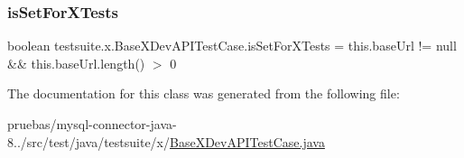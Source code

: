 \subsubsection{\texorpdfstring{is\+Set\+For\+X\+Tests}{isSetForXTests}}
{\footnotesize\ttfamily boolean testsuite.\+x.\+Base\+X\+Dev\+A\+P\+I\+Test\+Case.\+is\+Set\+For\+X\+Tests = this.\+base\+Url != null \&\& this.\+base\+Url.\+length() $>$ 0\hspace{0.3cm}{\ttfamily [protected]}}



The documentation for this class was generated from the following file\+:\begin{DoxyCompactItemize}
\item 
pruebas/mysql-\/connector-\/java-\/8../src/test/java/testsuite/x/\mbox{\hyperlink{_base_x_dev_a_p_i_test_case_8java}{Base\+X\+Dev\+A\+P\+I\+Test\+Case.\+java}}\end{DoxyCompactItemize}
